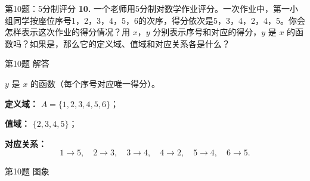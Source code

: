 \documentclass[10pt,aspectratio=169,serif]{beamer}
\begin{document}
\begin{frame}[t]{第10题：5分制评分}
\textbf{10.} 一个老师用5分制对数学作业评分。一次作业中，第一小组同学按座位序号1，2，3，4，5，6的次序，得分依次是5，3，4，2，4，5。你会怎样表示这次作业的得分情况？用 $x$，$y$ 分别表示序号和对应的得分，$y$ 是 $x$ 的函数吗？如果是，那么它的定义域、值域和对应关系各是什么？
\end{frame}

\begin{frame}[t]{第10题 解答}
\begin{tcolorbox}[colback=orange!10,colframe=orange,title=\textbf{解}]
$y$ 是 $x$ 的函数（每个序号对应唯一得分）。

\vspace{0.5em}
\textbf{定义域：} $A = \{1, 2, 3, 4, 5, 6\}$；

\textbf{值域：} $\{2, 3, 4, 5\}$；

\textbf{对应关系：}
\[
1 \to 5,\quad 2 \to 3,\quad 3 \to 4,\quad 4 \to 2,\quad 5 \to 4,\quad 6 \to 5.
\]
\end{tcolorbox}
\end{frame}

\begin{frame}[t]{第10题 图象}
\begin{center}
\end{center}
\end{frame}
\end{document}
